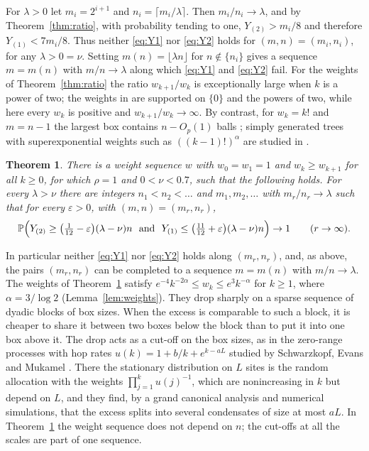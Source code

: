\documentclass[11pt]{amsart}
\newtheorem{theorem}{Theorem}[section]
\theoremstyle{remark}
\numberwithin{equation}{section}
\newcommand{\Pp}{\mathbb P}
\begin{document}
For $\lambda>0$ let $m_i=2^{i+1}$ and $n_i=\lceil m_i/\lambda\rceil$. Then $m_i/n_i\to\lambda$, and by Theorem~\ref{thm:ratio}, with probability tending to one, $Y_{(2)}>m_i/8$ and therefore $Y_{(1)}<7m_i/8$. Thus neither \eqref{eq:Y1} nor \eqref{eq:Y2} holds for $(m,n)=(m_i,n_i)$, for any $\lambda>0=\nu$. Setting $m(n)=\lfloor\lambda n\rfloor$ for $n\notin\{n_i\}$ gives a sequence $m=m(n)$ with $m/n\to\lambda$ along which \eqref{eq:Y1} and \eqref{eq:Y2} fail. For the weights of Theorem~\ref{thm:ratio} the ratio $w_{k+1}/w_k$ is exceptionally large when $k$ is a power of two; the weights in \cite[Example~19.38]{J12} are supported on $\{0\}$ and the powers of two, while here every $w_k$ is positive and $w_{k+1}/w_k\to\infty$. By contrast, for $w_k=k!$ and $m=n-1$ the largest box contains $n-O_p(1)$ balls \cite[Example~19.36]{J12}; simply generated trees with superexponential weights such as $((k-1)!)^\alpha$ are studied in \cite{JJS11}.

\begin{theorem}\label{thm:mono}
There is a weight sequence $w$ with $w_0=w_1=1$ and $w_k\ge w_{k+1}$ for all $k\ge0$, for which $\rho=1$ and $0<\nu<0.7$, such that the following holds. For every $\lambda>\nu$ there are integers $n_1<n_2<\dots$ and $m_1,m_2,\dots$ with $m_r/n_r\to\lambda$ such that for every $\varepsilon>0$, with $(m,n)=(m_r,n_r)$,
\[
\Pp\Bigl(Y_{(2)}\ge\bigl(\tfrac1{12}-\varepsilon\bigr)(\lambda-\nu)n\ \text{ and }\ Y_{(1)}\le\bigl(\tfrac{11}{12}+\varepsilon\bigr)(\lambda-\nu)n\Bigr)\to1\qquad(r\to\infty).
\]
\end{theorem}

In particular neither \eqref{eq:Y1} nor \eqref{eq:Y2} holds along $(m_r,n_r)$, and, as above, the pairs $(m_r,n_r)$ can be completed to a sequence $m=m(n)$ with $m/n\to\lambda$. The weights of Theorem~\ref{thm:mono} satisfy $e^{-4}k^{-2\alpha}\le w_k\le e^3k^{-\alpha}$ for $k\ge1$, where $\alpha=3/\log2$ (Lemma~\ref{lem:weights}). They drop sharply on a sparse sequence of dyadic blocks of box sizes. When the excess is comparable to such a block, it is cheaper to share it between two boxes below the block than to put it into one box above it. The drop acts as a cut-off on the box sizes, as in the zero-range processes with hop rates $u(k)=1+b/k+e^{k-aL}$ studied by Schwarzkopf, Evans and Mukamel \cite{SEM08}. There the stationary distribution on $L$ sites is the random allocation with the weights $\prod_{j=1}^ku(j)^{-1}$, which are nonincreasing in $k$ but depend on $L$, and they find, by a grand canonical analysis and numerical simulations, that the excess splits into several condensates of size at most $aL$. In Theorem~\ref{thm:mono} the weight sequence does not depend on $n$; the cut-offs at all the scales are part of one sequence.
\end{document}
